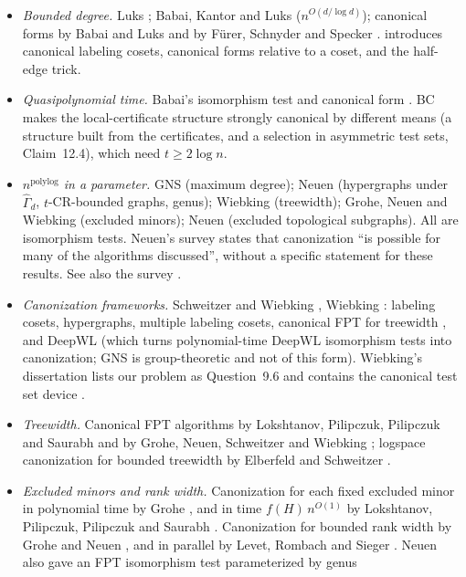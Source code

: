 \documentclass[11pt]{article}
\theoremstyle{plain}
\theoremstyle{definition}
\theoremstyle{remark}
\theoremstyle{named}
\theoremstyle{namedrm}
\newcommand{\polylog}{\operatorname{polylog}}
\newcommand{\Gd}{\widehat{\Gamma}_d}
\begin{document}
\begin{itemize}
\item \emph{Bounded degree.} Luks \cite{Luks82}; Babai, Kantor and Luks \cite{BKL83} ($n^{O(d/\log d)}$);
  canonical forms by Babai and Luks \cite{BL83} and by Fürer, Schnyder and Specker \cite{FSS83}. \cite{BL83}
  introduces canonical labeling cosets, canonical forms relative to a coset, and the half-edge trick.
\item \emph{Quasipolynomial time.} Babai's isomorphism test \cite{Bab16,Bab15} and canonical form
  \cite{Bab19}. BC makes the local-certificate structure strongly canonical \cite[Thm.~12.1]{Bab19} by
  different means (a structure built from the certificates, and a selection in asymmetric test sets,
  Claim~12.4), which need $t\ge2\log n$.
\item \emph{$n^{\polylog}$ in a parameter.} GNS \cite{GNS} (maximum degree); Neuen \cite{Neu20} (hypergraphs
  under $\Gd$, $t$-CR-bounded graphs, genus); Wiebking \cite{Wie20} (treewidth); Grohe, Neuen and Wiebking
  \cite{GNW} (excluded minors); Neuen \cite{Neu22t} (excluded topological subgraphs). All are isomorphism
  tests. Neuen's survey \cite{Neu26} states that canonization ``is possible for many of the algorithms
  discussed'', without a specific statement for these results. See also the survey \cite{GN21}.
\item \emph{Canonization frameworks.} Schweitzer and Wiebking \cite{SW19}, Wiebking \cite{Wie20,Wie21}:
  labeling cosets, hypergraphs, multiple labeling cosets, canonical FPT for treewidth \cite[Thm.~6.13]{Wie21},
  and DeepWL \cite{GSW21} (which turns polynomial-time DeepWL isomorphism tests into canonization; GNS is
  group-theoretic and not of this form). Wiebking's dissertation lists our problem as Question~9.6 and
  contains the canonical test set device \cite[Lemma~5.34]{Wie21}.
\item \emph{Treewidth.} Canonical FPT algorithms by Lokshtanov, Pilipczuk, Pilipczuk and Saurabh
  \cite{LPPS17} and by Grohe, Neuen, Schweitzer and Wiebking \cite{GNSW,Wie21}; logspace canonization for
  bounded treewidth by Elberfeld and Schweitzer \cite{ES16}.
\item \emph{Excluded minors and rank width.} Canonization for each fixed excluded minor in polynomial time
  by Grohe \cite{Gro12,Gro17}, and in time $f(H)\,n^{O(1)}$ by Lokshtanov, Pilipczuk, Pilipczuk and Saurabh
  \cite{LPPS22}. Canonization for bounded rank width by Grohe and Neuen \cite{GN19}, and in parallel by
  Levet, Rombach and Sieger \cite{LRS23}. Neuen also gave an FPT isomorphism test parameterized by genus

\end{itemize}
\end{document}
